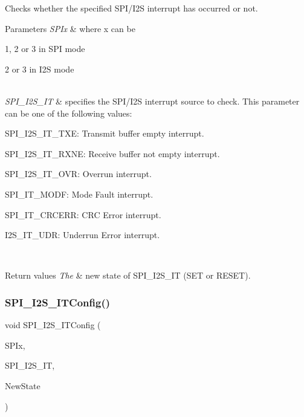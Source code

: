 Checks whether the specified S\+P\+I/\+I2S interrupt has occurred or not. 


\begin{DoxyParams}{Parameters}
{\em S\+P\+Ix} & where x can be
\begin{DoxyItemize}
\item 1, 2 or 3 in S\+PI mode
\item 2 or 3 in I2S mode 
\end{DoxyItemize}\\
\hline
{\em S\+P\+I\+\_\+\+I2\+S\+\_\+\+IT} & specifies the S\+P\+I/\+I2S interrupt source to check. This parameter can be one of the following values\+: \begin{DoxyItemize}
\item S\+P\+I\+\_\+\+I2\+S\+\_\+\+I\+T\+\_\+\+T\+XE\+: Transmit buffer empty interrupt. \item S\+P\+I\+\_\+\+I2\+S\+\_\+\+I\+T\+\_\+\+R\+X\+NE\+: Receive buffer not empty interrupt. \item S\+P\+I\+\_\+\+I2\+S\+\_\+\+I\+T\+\_\+\+O\+VR\+: Overrun interrupt. \item S\+P\+I\+\_\+\+I\+T\+\_\+\+M\+O\+DF\+: Mode Fault interrupt. \item S\+P\+I\+\_\+\+I\+T\+\_\+\+C\+R\+C\+E\+RR\+: C\+RC Error interrupt. \item I2\+S\+\_\+\+I\+T\+\_\+\+U\+DR\+: Underrun Error interrupt. \end{DoxyItemize}
\\
\hline
\end{DoxyParams}

\begin{DoxyRetVals}{Return values}
{\em The} & new state of S\+P\+I\+\_\+\+I2\+S\+\_\+\+IT (S\+ET or R\+E\+S\+ET). \\
\hline
\end{DoxyRetVals}
\mbox{\label{group___s_p_i___exported___functions_ga17f4ef132e8ddbf94cb6b1688d181e41}} 
\subsubsection{\texorpdfstring{SPI\_I2S\_ITConfig()}{SPI\_I2S\_ITConfig()}}
{\footnotesize\ttfamily void S\+P\+I\+\_\+\+I2\+S\+\_\+\+I\+T\+Config (\begin{DoxyParamCaption}\item[{\mbox{\hyperlink{struct_s_p_i___type_def}{S\+P\+I\+\_\+\+Type\+Def}} $\ast$}]{S\+P\+Ix,  }\item[{uint8\+\_\+t}]{S\+P\+I\+\_\+\+I2\+S\+\_\+\+IT,  }\item[{\mbox{\hyperlink{group___exported__types_gac9a7e9a35d2513ec15c3b537aaa4fba1}{Functional\+State}}}]{New\+State }\end{DoxyParamCaption})}




